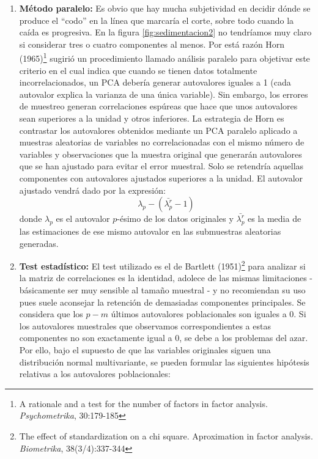 \begin{enumerate}
\begin{enumerate}
        \item \textbf{Método paralelo:} Es obvio que hay mucha subjetividad en decidir dónde se produce el ``codo'' en la línea que marcaría el corte, sobre todo cuando la caída es progresiva. En la figura \ref{fig:sedimentacion2} no tendríamos muy claro si considerar tres o cuatro componentes al menos. Por está razón Horn (1965)\footnote{A rationale and a test for the number of factors in factor analysis. \textsl{Psychometrika}, 30:179-185} sugirió un procedimiento llamado análisis paralelo para objetivar este criterio en el cual indica que cuando se tienen datos totalmente incorrelacionados, un PCA debería generar autovalores iguales a 1 (cada autovalor explica la varianza de una única variable). Sin embargo, los errores de muestreo generan correlaciones espúreas que hace que unos autovalores sean superiores a la unidad y otros inferiores. La estrategia de Horn es contrastar los autovalores obtenidos mediante un PCA paralelo aplicado a muestras aleatorias de variables no correlacionadas con el mismo número de variables y observaciones que la muestra original que generarán autovalores que se han ajustado para evitar el error muestral. Solo se retendría aquellas componentes con autovalores ajustados superiores a la unidad. El autovalor ajustado vendrá dado por la expresión:
        \begin{equation}
            \lambda_p-(\bar{\lambda_p^r}-1)
        \end{equation}
        donde $\lambda_p$ es el autovalor $p$-\'esimo de los datos originales y $\bar{\lambda_p^r}$ es la media de las estimaciones de ese mismo autovalor en las submuestras aleatorias generadas.
        \item \textbf{Test estadístico:} El test utilizado es el de Bartlett (1951)\footnote{The effect of standardization on a chi square. Aproximation in factor analysis. \textsl{Biometrika}, 38(3/4):337-344} para analizar si la matriz de correlaciones es la identidad, adolece de las mismas limitaciones - básicamente ser muy sensible al tamaño muestral - y no recomiendan su uso pues suele aconsejar la retención de demasiadas componentes principales. Se considera que los $p-m$ últimos autovalores poblacionales son iguales a 0. Si los autovalores muestrales que observamos correspondientes a estas componentes no son exactamente igual a 0, se debe a los problemas del azar. Por ello, bajo el supuesto de que las variables originales siguen una distribución normal multivariante, se pueden formular las siguientes hipótesis relativas a los autovalores poblacionales:

\end{enumerate}
\end{enumerate}
